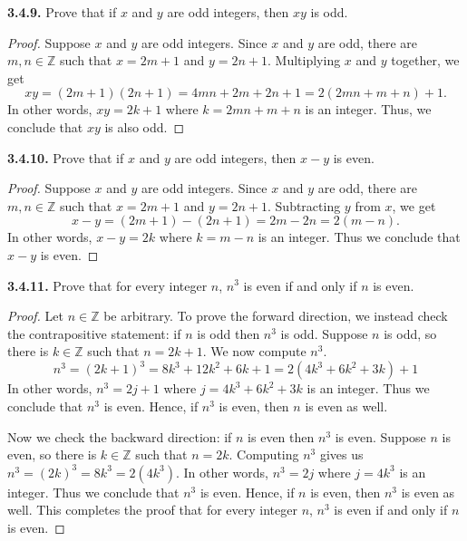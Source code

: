 \documentclass[12pt]{amsart}
\newenvironment{statement}[1]{\smallskip\noindent\color[rgb]{.6627, .3529, .6314} {\bf #1.}}{}
\theoremstyle{definition}
\theoremstyle{remark}
\newcommand{\BZ}{\mathbb Z}
\begin{document}
\begin{statement}{3.4.9}
Prove that if $x$ and $y$ are odd integers, then $xy$ is odd.
\end{statement}

\begin{proof}
Suppose $x$ and $y$ are odd integers.
Since $x$ and $y$ are odd, there are $m, n \in \BZ$ such that $x = 2m + 1$ and $y = 2n + 1$.
Multiplying $x$ and $y$ together, we get 
\begin{equation*}
	xy = (2m + 1)(2n + 1) = 4mn + 2m + 2n + 1 = 2(2mn + m + n) + 1.
\end{equation*}
In other words, $xy = 2k + 1$ where $k = 2mn + m + n$ is an integer.
Thus, we conclude that $xy$ is also odd.
\end{proof}


\begin{statement}{3.4.10}
Prove that if $x$ and $y$ are odd integers, then $x - y$ is even.
\end{statement}

\begin{proof}
Suppose $x$ and $y$ are odd integers.
Since $x$ and $y$ are odd, there are $m, n \in \BZ$ such that $x = 2m + 1$ and $y = 2n + 1$.
Subtracting $y$ from $x$, we get 
\begin{equation*}
	x - y = (2m + 1) - (2n + 1) = 2m - 2n = 2(m - n).
\end{equation*}
In other words, $x - y = 2k$ where $k = m - n$ is an integer.
Thus we conclude that $x - y$ is even.
\end{proof}


\begin{statement}{3.4.11}
Prove that for every integer $n$, $n^3$ is even if and only if $n$ is even.
\end{statement}

\begin{proof}
Let $n \in \BZ$ be arbitrary.
To prove the forward direction, we instead check the contrapositive statement: if $n$ is odd then $n^3$ is odd.
Suppose $n$ is odd, so there is $k \in \BZ$ such that $n = 2k + 1$.
We now compute $n^3$.
\begin{equation*}
	n^3 = (2k + 1)^3 = 8k^3 + 12k^2 + 6k + 1 = 2(4k^3 + 6k^2 + 3k) + 1
\end{equation*}
In other words, $n^3 = 2j + 1$ where $j = 4k^3 + 6k^2 + 3k$ is an integer.
Thus we conclude that $n^3$ is even.
Hence, if $n^3$ is even, then $n$ is even as well.

Now we check the backward direction: if $n$ is even then $n^3$ is even.
Suppose $n$ is even, so there is $k \in \BZ$ such that $n = 2k$.
Computing $n^3$ gives us $n^3 = (2k)^3 = 8k^3 = 2(4k^3)$.
In other words, $n^3 = 2j$ where $j = 4k^3$ is an integer.
Thus we conclude that $n^3$ is even.
Hence, if $n$ is even, then $n^3$ is even as well.
This completes the proof that for every integer $n$, $n^3$ is even if and only if $n$ is even.
\end{proof}
\end{document}
